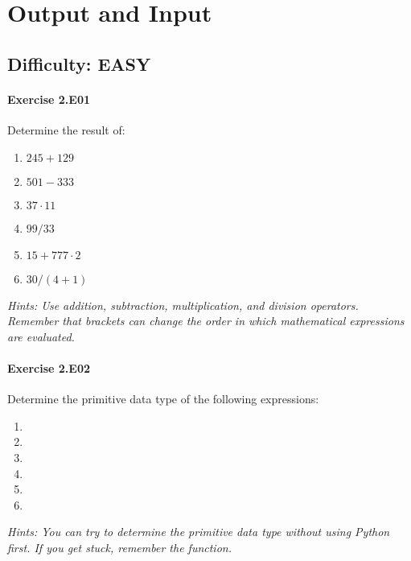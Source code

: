 \chapter{Output and Input}\label{CHAP_OutAndIn}

\section{Difficulty: EASY}


\subsubsection*{Exercise 2.E01}

Determine the result of:
\begin{enumerate}[label=(\alph*)]
	\item $245 + 129$
	\item $501 - 333$
	\item $37 \cdot 11$
	\item $99 / 33$
	\item $15 + 777 \cdot 2$
	\item $30 / (4 + 1)$
\end{enumerate}


\textit{Hints:
Use addition, subtraction, multiplication, and division operators. Remember that brackets
can change the order in which mathematical expressions are evaluated.}\\[1cm]




\subsubsection*{Exercise 2.E02}
Determine the primitive data type of the following expressions:
\begin{enumerate}[label=(\alph*)]
	\item {}
	\item {}
	\item {}
	\item {}
	\item {}
	\item {}
\end{enumerate}


\textit{Hints:
You can try to determine the primitive data type without using Python first. If you get stuck, remember the {} function.}\\[1cm]


